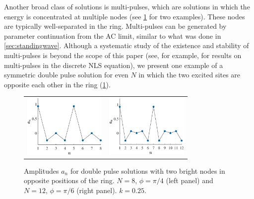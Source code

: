 \documentclass[reprint, amsmath,amssymb,aps,pra]{revtex4-2}
\begin{document}
Another broad class of solutions is multi-pulses, which are solutions in which the energy is concentrated at multiple nodes (see \cref{fig:dp} for two examples). These nodes are typically well-separated in the ring. Multi-pulses can be generated by parameter continuation from the AC limit, similar to what was done in \cref{sec:standingwave}. Although a systematic study of the existence and stability of multi-pulses is beyond the scope of this paper (see, for example, \cite{Parker2020} for results on multi-pulses in the discrete NLS equation), we present one example of a symmetric double pulse solution for even $N$ in which the two excited sites are opposite each other in the ring (\cref{fig:dp}). 

\begin{figure}
\begin{center}
\begin{tabular}{cc}
\includegraphics[width=4cm]{dp8pi4} &
\includegraphics[width=4cm]{dp12pi6}
\end{tabular}
\end{center}
\caption{Amplitudes $a_n$ for double pulse solutions with two bright nodes in opposite positions of the ring. $N=8$, $\phi=\pi/4$ (left panel) and $N=12$, $\phi=\pi/6$ (right panel). $k=0.25$.}
\label{fig:dp}
\end{figure}
\end{document}
